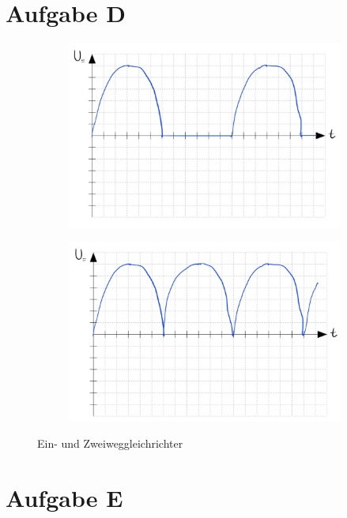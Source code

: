 \section*{Aufgabe D}
\begin{figure}[H]
    \begin{subfigure}[b]{0.45\textwidth}
        \includegraphics[width=\textwidth]{figs/Voraufgaben/Da.jpg}
        \caption{}
        \label{fig:VA_D_a}
    \end{subfigure}
    \hfill
    \begin{subfigure}[b]{0.45\textwidth}
        \includegraphics[width=\textwidth]{figs/Voraufgaben/Db.jpg}
        \caption{}
        \label{fig:VA_D_b}
    \end{subfigure}
    \caption{Ein- und Zweiweggleichrichter}
\end{figure}

\section*{Aufgabe E}
